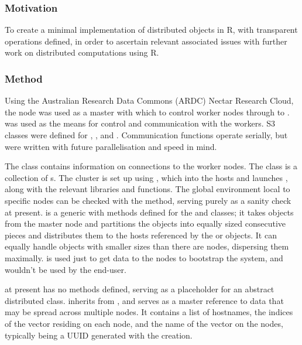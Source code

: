 \subsubsection{Motivation}\label{sec:ds-motivation}

To create a minimal implementation of distributed objects in R, with transparent operations defined, in order to ascertain relevant associated issues with further work on distributed computations using R.

\subsubsection{Method}\label{method}

Using the Australian Research Data Commons (ARDC) Nectar Research
Cloud\cite{nectar2021}, the  node was used as
a master with which to control worker nodes 
through to .   was used as the means
for control and communication with the workers.  S3 classes were
defined for , ,  and
.  Communication functions operate serially,
but were written with future parallelisation and speed in mind.

The  class contains information on connections to the worker nodes.
The  class is a collection of s.
The cluster is set up using , which  into the hosts and launches , along with the relevant libraries and functions.
The global environment local to specific nodes can be checked with the  method, serving purely as a sanity check at present.
 is a generic with
methods defined for the  and  classes; it
takes objects from the master node and partitions the objects into
equally sized consecutive pieces and distributes them to the hosts
referenced by the  or  objects.
It can equally handle objects with smaller  sizes than there are nodes, dispersing them maximally.
 is used just to get
data to the nodes to bootstrap the system, and wouldn't be used by the
end-user.

 at present has no methods defined, serving
as a placeholder for an abstract distributed class.
 inherits from ,
and serves as a master reference to data that may be spread across
multiple nodes.
It contains a list of hostnames, the indices of the vector residing on each node, and the name of the vector on the nodes, typically being a UUID generated with the  creation.


